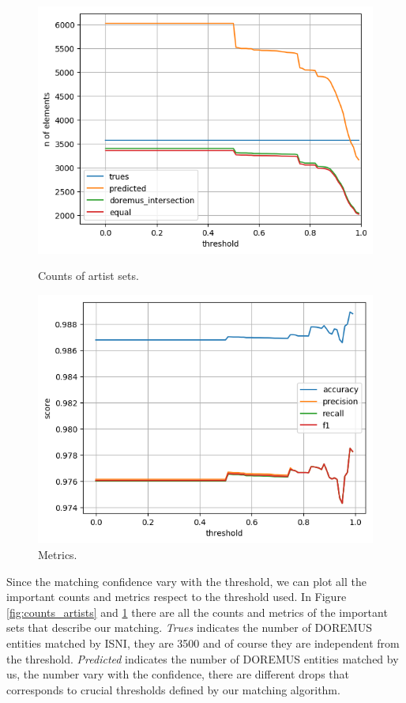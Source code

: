 \documentclass[paper=a4, fontsize=11pt]{scrartcl}
\newcommand{\textapprox}{\raisebox{0.5ex}{\texttildelow}}
\begin{document}
\begin{figure}[!htb]
  \centering
  \begin{minipage}[b]{0.49\textwidth}
    \includegraphics[width=\textwidth]{images/counts_artists.png}
    \caption{Counts of artist sets.}
    \label{fig:counts_artists}
  \end{minipage}
  \hfill
  \begin{minipage}[b]{0.49\textwidth}
    \includegraphics[width=\textwidth]{images/metrics_artists.png}
    \caption{Metrics.}
    \label{fig:metrics_artists}
  \end{minipage}
\end{figure}

Since the matching confidence vary with the threshold, we can plot all the important counts and metrics respect to the threshold used.
In Figure \ref{fig:counts_artists} and \ref{fig:metrics_artists} there are all the counts and metrics of the important sets that describe our matching.
\textit{Trues} indicates the number of DOREMUS entities matched by ISNI, they are  \textapprox3500 and of course they are independent from the threshold.
\textit{Predicted} indicates the number of DOREMUS entities matched by us, the number vary with the confidence, there are different drops that corresponds to crucial thresholds defined by our matching algorithm.
\end{document}
